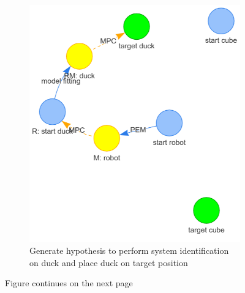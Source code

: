 \begin{figure}[H]
\begin{subfigure}[b]{0.49\textwidth}
         \includegraphics[width=\textwidth]{figures/swap/2.png}
         \caption{Generate hypothesis to perform system identification on duck and place duck on target position}
     \end{subfigure}
     \caption{Figure continues on the next page}
\end{figure}

